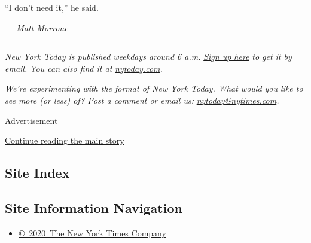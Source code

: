``I don't need it,'' he said.

\emph{--- Matt Morrone}

\begin{center}\rule{0.5\linewidth}{\linethickness}\end{center}

\emph{New York Today is published weekdays around 6 a.m.}
\href{https://www.nytimes.com/newsletters/newyorktoday?module=inline}{\emph{Sign
up here}} \emph{to get it by email. You can also find it at}
\href{http://www.nytoday.com/}{\emph{nytoday.com}}\emph{.}

\emph{We're experimenting with the format of New York Today. What would
you like to see more (or less) of? Post a comment or email us:}
\href{mailto:nytoday@nytimes.com}{\emph{nytoday@nytimes.com}}\emph{.}

Advertisement

\protect\hyperlink{after-bottom}{Continue reading the main story}

\hypertarget{site-index}{%
\subsection{Site Index}\label{site-index}}

\hypertarget{site-information-navigation}{%
\subsection{Site Information
Navigation}\label{site-information-navigation}}

\begin{itemize}
\tightlist
\item
  \href{https://help.nytimes.com/hc/en-us/articles/115014792127-Copyright-notice}{©~2020~The
  New York Times Company}
\end{itemize}

